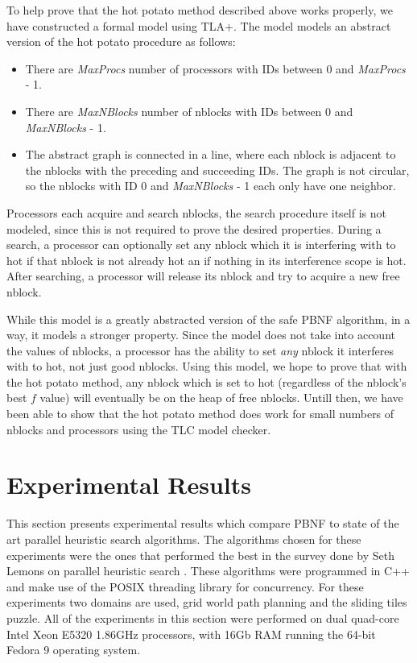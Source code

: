 \documentclass{article}
\begin{document}
 To help prove that the hot potato method described above works
 properly, we have constructed a formal model using TLA+.  The model
 models an abstract version of the hot potato procedure as follows:
 \begin{itemize}
 \item There are \emph{MaxProcs} number of processors with IDs between
   0 and \emph{MaxProcs} - 1.
 \item There are \emph{MaxNBlocks} number of nblocks with IDs between 0
   and \emph{MaxNBlocks} - 1.
 \item The abstract graph is connected in a line, where each nblock is
   adjacent to the nblocks with the preceding and succeeding IDs.  The
   graph is not circular, so the nblocks with ID 0 and
   \emph{MaxNBlocks} - 1 each only have one neighbor.
 \end{itemize}
 Processors each acquire and search nblocks, the search procedure
 itself is not modeled, since this is not required to prove the desired
 properties.  During a search, a processor can optionally set any
 nblock which it is interfering with to hot if that nblock is not
 already hot an if nothing in its interference scope is hot.  After
 searching, a processor will release its nblock and try to acquire a
 new free nblock.

 While this model is a greatly abstracted version of the safe PBNF
 algorithm, in a way, it models a stronger property.  Since the model
 does not take into account the values of nblocks, a processor has the
 ability to set \emph{any} nblock it interferes with to hot, not just
 good nblocks.  Using this model, we hope to prove that with the hot
 potato method, any nblock which is set to hot (regardless of the
 nblock's best $f$ value) will eventually be on the heap of free
 nblocks.  Untill then, we have been able to show that the hot potato
 method does work for small numbers of nblocks and processors using the
 TLC model checker.

 \section{Experimental Results}

 This section presents experimental results which compare PBNF to state
 of the art parallel heuristic search algorithms.  The algorithms
 chosen for these experiments were the ones that performed the best in
 the survey done by Seth Lemons on parallel heuristic search
 \cite{lemons:sur}.  These algorithms were programmed in C++ and make
 use of the POSIX threading library for concurrency.  For these
 experiments two domains are used, grid world path planning and the
 sliding tiles puzzle.  All of the experiments in this section were
 performed on dual quad-core Intel Xeon E5320 1.86GHz processors, with
 16Gb RAM running the 64-bit Fedora 9 operating system.
\end{document}
